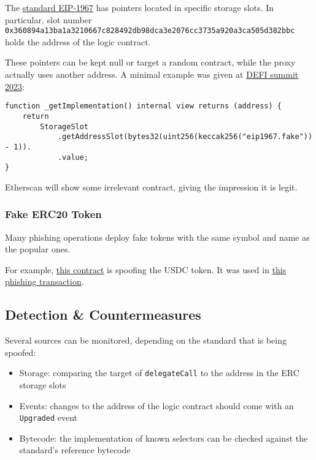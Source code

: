 The \href{\urlstandardeipproxy}{standard EIP-1967} has pointers located in specific storage slots.
In particular, slot number \lstinline{0x360894a13ba1a3210667c828492db98dca3e2076cc3735a920a3ca505d382bbc} holds the address of the logic contract.

These pointers can be kept null or target a random contract, while the proxy actually uses another address.
A minimal example was given at \href{\urlvideomasqueradingcode}{DEFI summit 2023}:

\begin{lstlisting}[language=Solidity]
function _getImplementation() internal view returns (address) {
    return
        StorageSlot
            .getAddressSlot(bytes32(uint256(keccak256("eip1967.fake")) - 1)).
            .value;
}
\end{lstlisting}

Etherscan will show some irrelevant contract, giving the impression it is legit.

\subsubsection{Fake ERC20 Token}

Many phishing operations deploy fake tokens with the same symbol and name as the popular ones.

For example, \href{https://etherscan.io/address/0x5ed7ca349efc40550eecef4b288158fb2b9f12de}{this contract} is spoofing the USDC token.
It was used in \href{https://explorer.phalcon.xyz/tx/eth/0x7448178a8a03a0f1f298b697507f0e9172eacf1d32d422f48d0345c19c76eba3?line=33}{this phishing transaction}.

\subsection{Detection \& Countermeasures}

Several sources can be monitored, depending on the standard that is being spoofed:

\begin{itemize}
\item{Storage: comparing the target of \lstinline[language=Solidity]{delegateCall} to the address in the ERC storage slots}
\item{Events: changes to the address of the logic contract should come with an \lstinline[language=Solidity]{Upgraded} event}
\item{Bytecode: the implementation of known selectors can be checked against the standard's reference bytecode}
\end{itemize}
